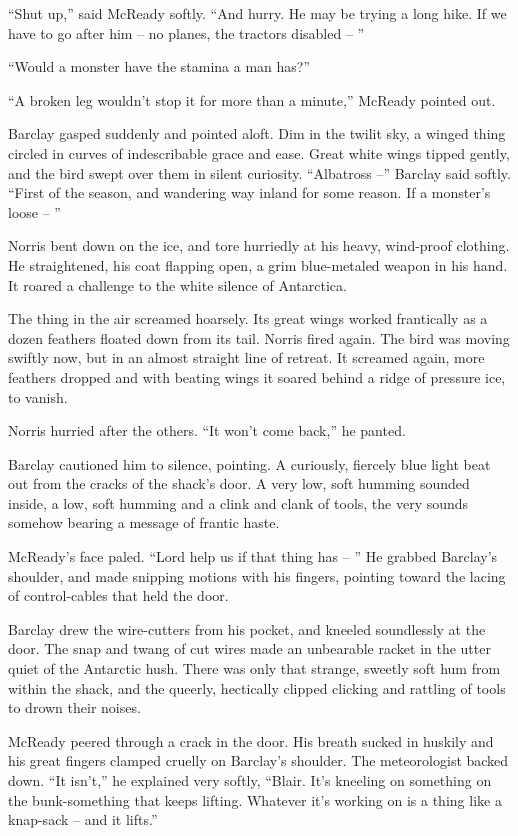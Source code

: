 \documentclass[letterpaper,openany,12pt]{memoir}		%
\begin{document}
``Shut up,'' said McReady softly. ``And hurry. He may be trying a long hike. If
we have to go after him -- no planes, the tractors disabled -- ''

``Would a monster have the stamina a man has?''

``A broken leg wouldn't stop it for more than a minute,'' McReady pointed out.

Barclay gasped suddenly and pointed aloft. Dim in the twilit sky, a winged thing
circled in curves of indescribable grace and ease. Great white wings tipped
gently, and the bird swept over them in silent curiosity. ``Albatross --''
Barclay said softly. ``First of the season, and wandering way inland for some
reason. If a monster's loose -- ''

Norris bent down on the ice, and tore hurriedly at his heavy, wind-proof
clothing. He straightened, his coat flapping open, a grim blue-metaled weapon in
his hand. It roared a challenge to the white silence of Antarctica.

The thing in the air screamed hoarsely. Its great wings worked frantically as a
dozen feathers floated down from its tail. Norris fired again. The bird was
moving swiftly now, but in an almost straight line of retreat. It screamed
again, more feathers dropped and with beating wings it soared behind a ridge of
pressure ice, to vanish.

Norris hurried after the others. ``It won't come back,'' he panted.

Barclay cautioned him to silence, pointing. A curiously, fiercely blue light
beat out from the cracks of the shack's door. A very low, soft humming sounded
inside, a low, soft humming and a clink and clank of tools, the very sounds
somehow bearing a message of frantic haste.

McReady's face paled. ``Lord help us if that thing has -- '' He grabbed
Barclay's shoulder, and made snipping motions with his fingers, pointing toward
the lacing of control-cables that held the door.

Barclay drew the wire-cutters from his pocket, and kneeled soundlessly at the
door. The snap and twang of cut wires made an unbearable racket in the utter
quiet of the Antarctic hush. There was only that strange, sweetly soft hum from
within the shack, and the queerly, hectically clipped clicking and rattling of
tools to drown their noises.

McReady peered through a crack in the door. His breath sucked in huskily and his
great fingers clamped cruelly on Barclay's shoulder. The meteorologist backed
down. ``It isn't,'' he explained very softly, ``Blair. It's kneeling on
something on the bunk-something that keeps lifting. Whatever it's working on is
a thing like a knap-sack -- and it lifts.''
\end{document}
